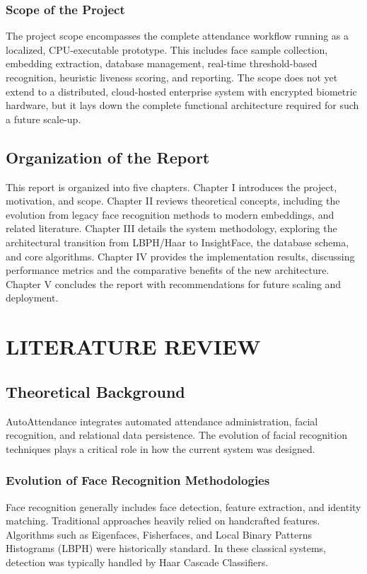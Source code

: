 \documentclass[12pt,a4paper]{report}
\newcommand{\JustifiedNormal}{\fontsize{12}{14}\selectfont\justifying\setlength{\parindent}{0pt}}
\begin{document}
\subsection{Scope of the Project}
\JustifiedNormal
The project scope encompasses the complete attendance workflow running as a localized, CPU-executable prototype. This includes face sample collection, embedding extraction, database management, real-time threshold-based recognition, heuristic liveness scoring, and reporting. The scope does not yet extend to a distributed, cloud-hosted enterprise system with encrypted biometric hardware, but it lays down the complete functional architecture required for such a future scale-up.

\section{Organization of the Report}
\JustifiedNormal
This report is organized into five chapters. Chapter I introduces the project, motivation, and scope. Chapter II reviews theoretical concepts, including the evolution from legacy face recognition methods to modern embeddings, and related literature. Chapter III details the system methodology, exploring the architectural transition from LBPH/Haar to InsightFace, the database schema, and core algorithms. Chapter IV provides the implementation results, discussing performance metrics and the comparative benefits of the new architecture. Chapter V concludes the report with recommendations for future scaling and deployment.

\chapter{LITERATURE REVIEW}

\section{Theoretical Background}
\JustifiedNormal
AutoAttendance integrates automated attendance administration, facial recognition, and relational data persistence. The evolution of facial recognition techniques plays a critical role in how the current system was designed.

\subsection{Evolution of Face Recognition Methodologies}
\JustifiedNormal
Face recognition generally includes face detection, feature extraction, and identity matching. Traditional approaches heavily relied on handcrafted features. Algorithms such as Eigenfaces, Fisherfaces, and Local Binary Patterns Histograms (LBPH) were historically standard. In these classical systems, detection was typically handled by Haar Cascade Classifiers. 
\end{document}
